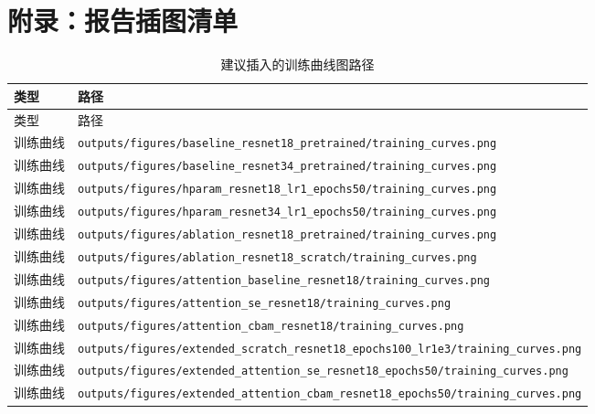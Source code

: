 \documentclass[UTF8]{ctexart}
\begin{document}
\section{附录：报告插图清单}
\begin{longtable}{p{}p{}}
\caption{建议插入的训练曲线图路径}
\label{tab:curve-list}\\
\toprule
类型 & 路径 \\
\midrule
\endfirsthead
\toprule
类型 & 路径 \\
\midrule
\endhead
训练曲线 & \verb|outputs/figures/baseline_resnet18_pretrained/training_curves.png| \\
训练曲线 & \verb|outputs/figures/baseline_resnet34_pretrained/training_curves.png| \\
训练曲线 & \verb|outputs/figures/hparam_resnet18_lr1_epochs50/training_curves.png| \\
训练曲线 & \verb|outputs/figures/hparam_resnet34_lr1_epochs50/training_curves.png| \\
训练曲线 & \verb|outputs/figures/ablation_resnet18_pretrained/training_curves.png| \\
训练曲线 & \verb|outputs/figures/ablation_resnet18_scratch/training_curves.png| \\
训练曲线 & \verb|outputs/figures/attention_baseline_resnet18/training_curves.png| \\
训练曲线 & \verb|outputs/figures/attention_se_resnet18/training_curves.png| \\
训练曲线 & \verb|outputs/figures/attention_cbam_resnet18/training_curves.png| \\
训练曲线 & \verb|outputs/figures/extended_scratch_resnet18_epochs100_lr1e3/training_curves.png| \\
训练曲线 & \verb|outputs/figures/extended_attention_se_resnet18_epochs50/training_curves.png| \\
训练曲线 & \verb|outputs/figures/extended_attention_cbam_resnet18_epochs50/training_curves.png| \\
\bottomrule
\end{longtable}
\end{document}
